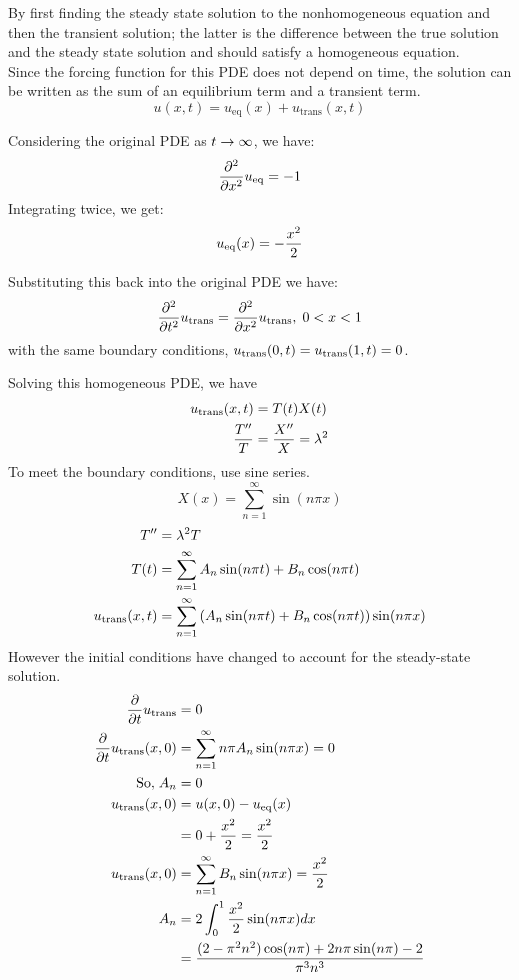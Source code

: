 \documentclass[12pt]{article}
\begin{document}
By first finding the steady state solution to the nonhomogeneous equation and then the transient solution; the latter is the difference between the true solution and the steady state solution and should satisfy a homogeneous equation.
\[ \]
Since the forcing function for this PDE does not depend on time, the solution can be written as the sum of an equilibrium term and a transient term.
\[ u(x,t) = u_{\mathrm{eq}}(x) + u_{\mathrm{trans}}(x,t) \]

Considering the original PDE as $t \rightarrow \infty$, we have:
\[ \frac{\partial^2}{\partial x^2}u_\mathrm{eq} = -1 \]
Integrating twice, we get:
\[ u_\mathrm{eq}(x) = -\frac{x^2}{2} \]

Substituting this back into the original PDE we have:
\[ \frac{\partial^2}{\partial t^2}u_\mathrm{trans} = \frac{\partial^2}{\partial x^2}u_\mathrm{trans}, \; 0 < x < 1 \]
with the same boundary conditions, $u_\mathrm{trans}(0,t) = u_\mathrm{trans}(1,t) = 0$.

Solving this homogeneous PDE, we have
\begin{align*}
u_\mathrm{trans}(x,t) &= T(t)X(t) \\
\frac{T^{\prime\prime}}{T} &= \frac{X^{\prime\prime}}{X} = \lambda^2 \\
\end{align*}
To meet the boundary conditions, use sine series.
\[ X(x) = \sum_{n=1}^\infty \sin(n\pi x) \]
\begin{align*}
T^{\prime\prime} &= \lambda^2 T \\
T(t) &= \sum_{n=1}^\infty A_n\sin(n\pi t) + B_n\cos(n\pi t) \\
u_\mathrm{trans}(x,t) &= \sum_{n=1}^\infty \left ( A_n\sin(n\pi t) + B_n\cos(n\pi t)\right ) \sin(n\pi x)
\end{align*}
However the initial conditions have changed to account for the steady-state solution.
\begin{align*}
\frac{\partial}{\partial t}u_\mathrm{trans} &= 0 \\
\frac{\partial}{\partial t}u_\mathrm{trans}(x,0) &= \sum_{n=1}^\infty n\pi A_n\sin(n\pi x) = 0 \\
\; \mathrm{So,} \; A_n &= 0 \\
u_\mathrm{trans}(x, 0) &= u(x, 0) - u_\mathrm{eq}(x) \\
&= 0 + \frac{x^2}{2} = \frac{x^2}{2} \\
u_\mathrm{trans}(x,0) &= \sum_{n=1}^\infty B_n\sin(n\pi x) = \frac{x^2}{2} \\
A_n &= 2\int_0^1 \frac{x^2}{2}\sin(n\pi x)dx \\
&= \frac{(2 - \pi^2n^2)\cos(n\pi)+2n\pi\sin(n\pi) - 2}{\pi^3n^3}\\
\end{align*}

\newpage
\end{document}
